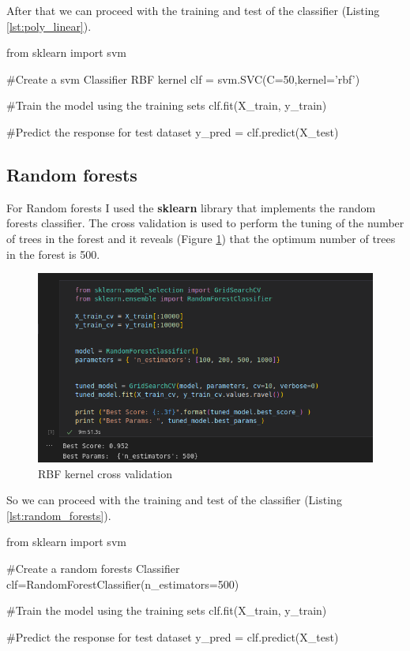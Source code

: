 \documentclass[12pt]{article}
\begin{document}
After that we can proceed with the training and test of the classifier 
(Listing \ref{lst:poly_linear}).

\begin{python}[caption={SVM RBF kernel},label={lst:rbf_linear}]
from sklearn import svm

#Create a svm Classifier RBF kernel
clf = svm.SVC(C=50,kernel='rbf') 

#Train the model using the training sets
clf.fit(X_train, y_train)

#Predict the response for test dataset
y_pred = clf.predict(X_test)
\end{python}


\subsection{Random forests}
For Random forests I used the \textbf{sklearn} library that implements the random 
forests classifier.
The cross validation is used to perform the tuning of the number of trees in the 
forest and it reveals (Figure \ref{fig:rf_cross}) that the optimum number of trees in the forest is 500.

\begin{figure}[H]
    \centering
    \includegraphics[scale=0.54]{rf_cross.png}
    \caption{RBF kernel cross validation}
    \label{fig:rf_cross}
\end{figure}

So we can proceed with the training and test of the classifier 
(Listing \ref{lst:random_forests}).

\begin{python}[caption={Random forests},label={lst:random_forests}]
from sklearn import svm

#Create a random forests Classifier
clf=RandomForestClassifier(n_estimators=500)

#Train the model using the training sets
clf.fit(X_train, y_train)

#Predict the response for test dataset
y_pred = clf.predict(X_test)
\end{python}
\end{document}
